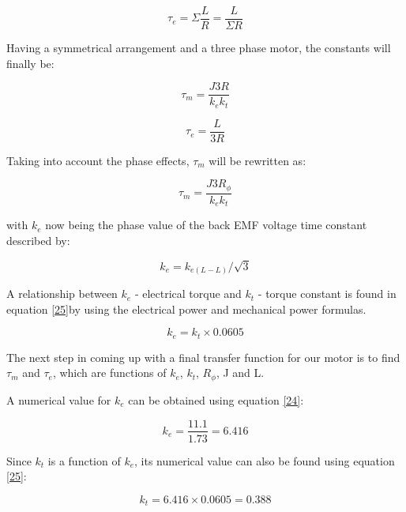 \begin{equation}
\label{20}
	\tau_{e}=\Sigma{\frac{L}{R}}=\frac{L}{\Sigma{R}}
\end{equation}

Having a symmetrical arrangement and a three phase motor, the constants will finally be:

\begin{equation}
\label{21}
	\tau_{m}=\frac{J3R}{k_{e}k_{t}}
\end{equation}

\begin{equation}
\label{22}
	\tau_{e}=\frac{L}{3R}
\end{equation}

Taking into account the phase effects, $\tau_{m}$ will be rewritten as:

\begin{equation}
\label{23}
	\tau_{m}=\frac{J3R_{\phi}}{k_{e}k_{t}}
\end{equation}

with $k_{e}$ now being the phase value of the back EMF voltage time constant described by:

\begin{equation}
\label{24}
	k_{e}=k_{e(L-L)}/\sqrt{3}
\end{equation}

A relationship between $k_{e}$ - electrical torque and $k_{t}$ - torque constant is found in equation \ref{25}by using the electrical power and mechanical power formulas.

\begin{equation}
\label{25}
	k_{e}=k_{t}\times0.0605
\end{equation}

The next step in coming up with a final transfer function for our motor is to find $\tau_{m}$ and $\tau_{e}$, which are functions of $k_{e}$, $k_{t}$, $R_{\phi}$, J and L. 

A numerical value for $k_{e}$ can be obtained using equation \ref{24}:

\begin{equation}
\label{26}
	k_{e}=\frac{11.1}{1.73}=6.416
\end{equation}

Since $k_{t}$ is a function of $k_{e}$, its numerical value can also be found using equation \ref{25}:

\begin{equation}
\label{27}
	k_{t}=6.416\times0.0605=0.388
\end{equation}

